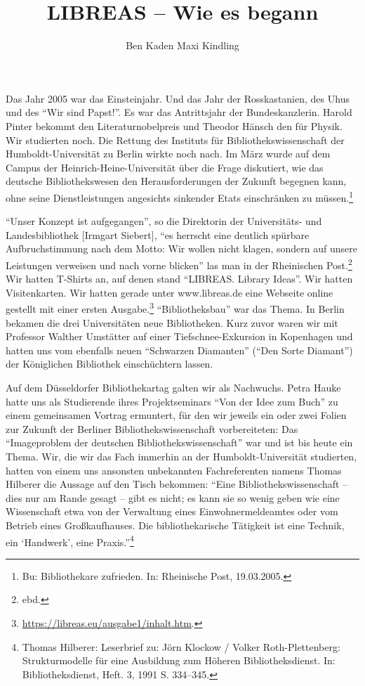 
\title{LIBREAS -- Wie es begann} 
\author{Ben Kaden \lastand Maxi Kindling}

Das Jahr 2005 war das Einsteinjahr. Und das Jahr der Rosskastanien, des
Uhus und des \enquote{Wir sind Papst!}. Es war das Antrittsjahr der
Bundeskanzlerin. Harold Pinter bekommt den Literaturnobelpreis und
Theodor Hänsch den für Physik. Wir studierten noch. Die Rettung des
Instituts für Bibliothekswissenschaft der Humboldt-Universität zu Berlin
wirkte noch nach. Im März wurde auf dem Campus der
Heinrich-Heine-Universität über die Frage diskutiert, wie das deutsche
Bibliothekswesen den Herausforderungen der Zukunft begegnen kann, ohne
seine Dienstleistungen angesichts sinkender Etats einschränken zu
müssen.\footnote{Bu: Bibliothekare zufrieden. In: Rheinische Post,
  19.03.2005.}

\enquote{Unser Konzept ist aufgegangen}, so die Direktorin der
Universitäts- und Landesbibliothek {[}Irmgart Siebert{]}, \enquote{es
herrscht eine deutlich spürbare Aufbruchstimmung nach dem Motto: Wir
wollen nicht klagen, sondern auf unsere Leistungen verweisen und nach
vorne blicken} las man in der Rheinischen Post.\footnote{ebd.} Wir
hatten T-Shirts an, auf denen stand \enquote{LIBREAS. Library Ideas}.
Wir hatten Visitenkarten. Wir hatten gerade unter www.libreas.de eine
Webseite online gestellt mit einer ersten Ausgabe.\footnote{\url{https://libreas.eu/ausgabe1/inhalt.htm}.}
\enquote{Bibliotheksbau} war das Thema. In Berlin bekamen die drei
Universitäten neue Bibliotheken. Kurz zuvor waren wir mit Professor
Walther Umstätter auf einer Tiefschnee-Exkursion in Kopenhagen und
hatten uns vom ebenfalls neuen \enquote{Schwarzen Diamanten}
(\enquote{Den Sorte Diamant}) der Königlichen Bibliothek einschüchtern
lassen.

Auf dem Düsseldorfer Bibliothekartag galten wir als Nachwuchs. Petra
Hauke hatte uns als Studierende ihres Projektseminars \enquote{Von der
Idee zum Buch} zu einem gemeinsamen Vortrag ermuntert, für den wir
jeweils ein oder zwei Folien zur Zukunft der Berliner
Bibliothekswissenschaft vorbereiteten: Das \enquote{Imageproblem der
deutschen Bibliothekswissenschaft} war und ist bis heute ein Thema. Wir,
die wir das Fach immerhin an der Humboldt-Universität studierten, hatten
von einem uns ansonsten unbekannten Fachreferenten namens Thomas
Hilberer die Aussage auf den Tisch bekommen: \enquote{Eine
Bibliothekswissenschaft -- dies nur am Rande gesagt -- gibt es nicht; es
kann sie so wenig geben wie eine Wissenschaft etwa von der Verwaltung
eines Einwohnermeldeamtes oder vom Betrieb eines Großkaufhauses. Die
bibliothekarische Tätigkeit ist eine Technik, ein \enquote*{Handwerk},
eine Praxis.}\footnote{Thomas Hilberer: Leserbrief zu: Jörn Klockow /
  Volker Roth-Plettenberg: Strukturmodelle für eine Ausbildung zum
  Höheren Bibliotheksdienst. In: Bibliotheksdienst, Heft. 3, 1991 S.
  334--345.}

